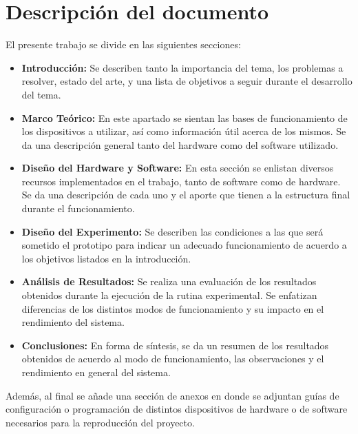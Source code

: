 \section{Descripción del documento}

El presente trabajo se divide en las siguientes secciones: 

\begin{itemize}
\item \textbf{Introducción:} Se describen tanto la importancia del tema, los problemas a resolver, estado del arte, y una lista de objetivos a seguir durante el desarrollo del tema.\\
\item \textbf{Marco Teórico:} En este apartado se sientan las bases de funcionamiento de los dispositivos a utilizar, así como información útil acerca de los mismos. Se da una descripción general tanto del hardware como del software utilizado.\\
\item \textbf{Diseño del Hardware y Software:} En esta sección se enlistan diversos recursos implementados en el trabajo, tanto de software como de hardware. Se da una descripción de cada uno y el aporte que tienen a la estructura final durante el funcionamiento.\\
\item \textbf{Diseño del Experimento:} Se describen las condiciones a las que será sometido el prototipo para indicar un adecuado funcionamiento de acuerdo a los objetivos listados en la introducción.\\
\item \textbf{Análisis de Resultados:} Se realiza una evaluación de los resultados obtenidos durante la ejecución de la rutina experimental. Se enfatizan diferencias de los distintos modos de funcionamiento y su impacto en el rendimiento del sistema.\\
\item \textbf{Conclusiones:} En forma de síntesis, se da un resumen de los resultados obtenidos de acuerdo al modo de funcionamiento, las observaciones  y el rendimiento en general del sistema.\\
\end{itemize}

Además, al final se añade una sección de anexos en donde se adjuntan guías de configuración o programación de distintos dispositivos de hardware o de software necesarios para la reproducción del proyecto.\\

